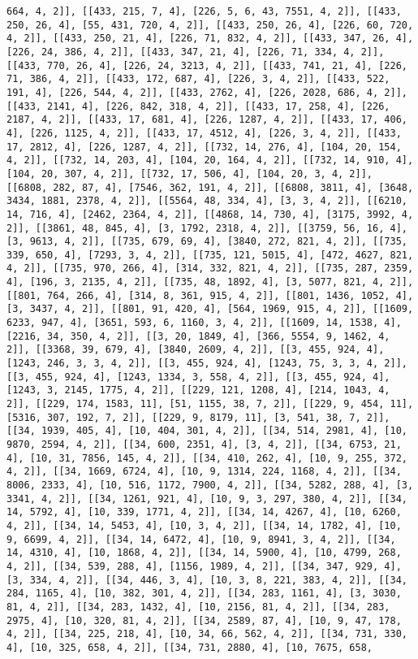 \documentclass[12pt,fleqn]{article}\usepackage{../../common}
\begin{document}
\begin{verbatim}
664, 4, 2]], [[433, 215, 7, 4], [226, 5, 6, 43, 7551, 4, 2]], [[433, 250, 26, 4], [55, 431, 720, 4, 2]], [[433, 250, 26, 4], [226, 60, 720, 4, 2]], [[433, 250, 21, 4], [226, 71, 832, 4, 2]], [[433, 347, 26, 4], [226, 24, 386, 4, 2]], [[433, 347, 21, 4], [226, 71, 334, 4, 2]], [[433, 770, 26, 4], [226, 24, 3213, 4, 2]], [[433, 741, 21, 4], [226, 71, 386, 4, 2]], [[433, 172, 687, 4], [226, 3, 4, 2]], [[433, 522, 191, 4], [226, 544, 4, 2]], [[433, 2762, 4], [226, 2028, 686, 4, 2]], [[433, 2141, 4], [226, 842, 318, 4, 2]], [[433, 17, 258, 4], [226, 2187, 4, 2]], [[433, 17, 681, 4], [226, 1287, 4, 2]], [[433, 17, 406, 4], [226, 1125, 4, 2]], [[433, 17, 4512, 4], [226, 3, 4, 2]], [[433, 17, 2812, 4], [226, 1287, 4, 2]], [[732, 14, 276, 4], [104, 20, 154, 4, 2]], [[732, 14, 203, 4], [104, 20, 164, 4, 2]], [[732, 14, 910, 4], [104, 20, 307, 4, 2]], [[732, 17, 506, 4], [104, 20, 3, 4, 2]], [[6808, 282, 87, 4], [7546, 362, 191, 4, 2]], [[6808, 3811, 4], [3648, 3434, 1881, 2378, 4, 2]], [[5564, 48, 334, 4], [3, 3, 4, 2]], [[6210, 14, 716, 4], [2462, 2364, 4, 2]], [[4868, 14, 730, 4], [3175, 3992, 4, 2]], [[3861, 48, 845, 4], [3, 1792, 2318, 4, 2]], [[3759, 56, 16, 4], [3, 9613, 4, 2]], [[735, 679, 69, 4], [3840, 272, 821, 4, 2]], [[735, 339, 650, 4], [7293, 3, 4, 2]], [[735, 121, 5015, 4], [472, 4627, 821, 4, 2]], [[735, 970, 266, 4], [314, 332, 821, 4, 2]], [[735, 287, 2359, 4], [196, 3, 2135, 4, 2]], [[735, 48, 1892, 4], [3, 5077, 821, 4, 2]], [[801, 764, 266, 4], [314, 8, 361, 915, 4, 2]], [[801, 1436, 1052, 4], [3, 3437, 4, 2]], [[801, 91, 420, 4], [564, 1969, 915, 4, 2]], [[1609, 6233, 947, 4], [3651, 593, 6, 1160, 3, 4, 2]], [[1609, 14, 1538, 4], [2216, 34, 350, 4, 2]], [[3, 20, 1849, 4], [366, 5554, 9, 1462, 4, 2]], [[3368, 39, 679, 4], [3840, 2609, 4, 2]], [[3, 455, 924, 4], [1243, 246, 3, 3, 4, 2]], [[3, 455, 924, 4], [1243, 75, 3, 3, 4, 2]], [[3, 455, 924, 4], [1243, 1334, 3, 558, 4, 2]], [[3, 455, 924, 4], [1243, 3, 2145, 1775, 4, 2]], [[229, 121, 1208, 4], [214, 1043, 4, 2]], [[229, 174, 1583, 11], [51, 1155, 38, 7, 2]], [[229, 9, 454, 11], [5316, 307, 192, 7, 2]], [[229, 9, 8179, 11], [3, 541, 38, 7, 2]], [[34, 1939, 405, 4], [10, 404, 301, 4, 2]], [[34, 514, 2981, 4], [10, 9870, 2594, 4, 2]], [[34, 600, 2351, 4], [3, 4, 2]], [[34, 6753, 21, 4], [10, 31, 7856, 145, 4, 2]], [[34, 410, 262, 4], [10, 9, 255, 372, 4, 2]], [[34, 1669, 6724, 4], [10, 9, 1314, 224, 1168, 4, 2]], [[34, 8006, 2333, 4], [10, 516, 1172, 7900, 4, 2]], [[34, 5282, 288, 4], [3, 3341, 4, 2]], [[34, 1261, 921, 4], [10, 9, 3, 297, 380, 4, 2]], [[34, 14, 5792, 4], [10, 339, 1771, 4, 2]], [[34, 14, 4267, 4], [10, 6260, 4, 2]], [[34, 14, 5453, 4], [10, 3, 4, 2]], [[34, 14, 1782, 4], [10, 9, 6699, 4, 2]], [[34, 14, 6472, 4], [10, 9, 8941, 3, 4, 2]], [[34, 14, 4310, 4], [10, 1868, 4, 2]], [[34, 14, 5900, 4], [10, 4799, 268, 4, 2]], [[34, 539, 288, 4], [1156, 1989, 4, 2]], [[34, 347, 929, 4], [3, 334, 4, 2]], [[34, 446, 3, 4], [10, 3, 8, 221, 383, 4, 2]], [[34, 284, 1165, 4], [10, 382, 301, 4, 2]], [[34, 283, 1161, 4], [3, 3030, 81, 4, 2]], [[34, 283, 1432, 4], [10, 2156, 81, 4, 2]], [[34, 283, 2975, 4], [10, 320, 81, 4, 2]], [[34, 2589, 87, 4], [10, 9, 47, 178, 4, 2]], [[34, 225, 218, 4], [10, 34, 66, 562, 4, 2]], [[34, 731, 330, 4], [10, 325, 658, 4, 2]], [[34, 731, 2880, 4], [10, 7675, 658, 
\end{verbatim}
\end{document}
